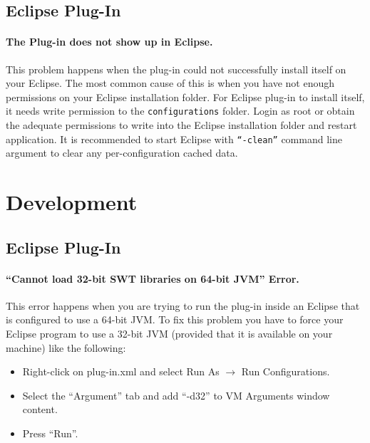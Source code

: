 \subsection{Eclipse Plug-In}
\label{trouble:eclipse_install}
\paragraph{The Plug-in does not show up in Eclipse.} This problem happens when the plug-in could not successfully install itself on your Eclipse. The most common cause of this is when you have not enough permissions on your Eclipse installation folder. For Eclipse plug-in to install itself, it needs write permission to the \texttt{configurations} folder. Login as root or obtain the adequate permissions to write into the Eclipse installation folder and restart application.
It is recommended to start Eclipse with \texttt{``-clean''} command line argument to clear any per-configuration cached data.

\section{Development}
\subsection{Eclipse Plug-In}
\paragraph{``Cannot load 32-bit SWT libraries on 64-bit JVM'' Error.} This error happens when you are trying to run the plug-in inside an Eclipse that is configured to use a 64-bit JVM. To fix this problem you have to force your Eclipse program to use a 32-bit JVM (provided that it is available on your machine) like the following:
\begin{itemize}
\item Right-click on plug-in.xml and select Run As $\rightarrow$ Run Configurations.
\item Select the ``Argument'' tab and add ``-d32'' to VM Arguments window content.
\item Press ``Run''.
\end{itemize}